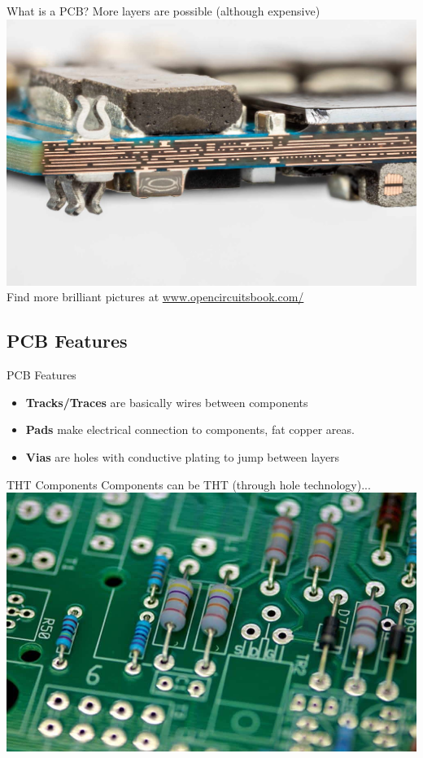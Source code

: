 \documentclass{beamer}
\begin{document}
\begin{frame}{What is a PCB?}
  \centering
  More layers are possible (although expensive)
  \includegraphics[width=\textwidth]{images/open-circuit2.jpg}\\
  Find more brilliant pictures at \href{https://www.opencircuitsbook.com/}{www.opencircuitsbook.com/}
\end{frame}

\subsection{PCB Features}

\begin{frame}{PCB Features}
  \begin{itemize}
    \item \textbf{Tracks/Traces} are basically wires between components
    \item \textbf{Pads} make electrical connection to components, fat copper areas.
    \item \textbf{Vias} are holes with conductive plating to jump between layers
  \end{itemize}
\end{frame}

\begin{frame}{THT Components}
  Components can be THT (through hole technology)...\\
  \includegraphics[width=\textwidth]{images/tht-placement.png}
\end{frame}
\end{document}
